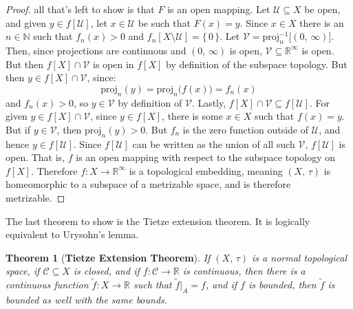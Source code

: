 \documentclass{article}
\theoremstyle{plain}
\newtheorem{theorem}{Theorem}[section]
\theoremstyle{normal}
\begin{document}
\begin{proof}
            all that's left to show is that $F$ is an open mapping.
            Let $\mathcal{U}\subseteq{X}$ be open, and given
            $y\in{f}[\mathcal{U}]$, let $x\in\mathcal{U}$ be such that
            $F(x)=y$. Since $x\in{X}$ there is an $n\in\mathbb{N}$ such that
            $f_{n}(x)>0$ and $f_{n}[X\setminus\mathcal{U}]=\{\,0\,\}$.
            Let $\mathcal{V}=\textrm{proj}_{n}^{-1}\big[(0,\,\infty)\big]$.
            Then, since projections are continuous and $(0,\,\infty)$ is open,
            $\mathcal{V}\subseteq\mathbb{R}^{\infty}$ is open. But then
            $f[X]\cap\mathcal{V}$ is open in $f[X]$ by definition of the
            subspace topology. But then $y\in{f}[X]\cap\mathcal{V}$, since:
            \begin{equation}
                \textrm{proj}_{n}(y)
                =\textrm{proj}_{n}\big(f(x)\big)
                =f_{n}(x)
            \end{equation}
            and $f_{n}(x)>0$, so $y\in\mathcal{V}$ by definition of
            $\mathcal{V}$. Lastly,
            $f[X]\cap\mathcal{V}\subseteq{f}[\mathcal{U}]$. For given
            $y\in{f}[X]\cap\mathcal{V}$, since $y\in{f}[X]$, there is some
            $x\in{X}$ such that $f(x)=y$. But if
            $y\in\mathcal{V}$, then $\textrm{proj}_{n}(y)>0$. But
            $f_{n}$ is the zero function outside of $\mathcal{U}$, and hence
            $y\in{f}[\mathcal{U}]$. Since $f[\mathcal{U}]$ can be written as
            the union of all such $\mathcal{V}$, $f[\mathcal{U}]$ is open.
            That is, $f$ is an open mapping with respect to the subspace
            topology on $f[X]$. Therefore $f:X\rightarrow\mathbb{R}^{\infty}$
            is a topological embedding, meaning $(X,\,\tau)$ is homeomorphic
            to a subspace of a metrizable space, and is therefore metrizable.
        \end{proof}
        The last theorem to show is the Tietze extension theorem. It is
        logically equivalent to Urysohn's lemma.
        \begin{theorem}[\textbf{Tietze Extension Theorem}]
            If $(X,\,\tau)$ is a normal topological space, if
            $\mathcal{C}\subseteq{X}$ is closed, and if
            $f:\mathcal{C}\rightarrow\mathbb{R}$ is continuous, then there is
            a continuous function $\tilde{f}:X\rightarrow\mathbb{R}$ such that
            $\tilde{f}|_{A}=f$, and if $f$ is bounded, then $\tilde{f}$ is
            bounded as well with the same bounds.
        \end{theorem}
\end{document}
